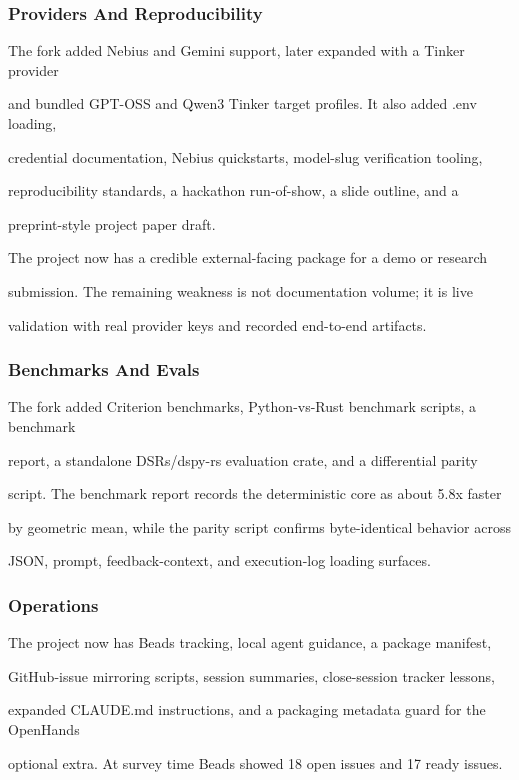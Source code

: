 \documentclass[twocolumn,10pt,letterpaper]{article}
\begin{document}
\subsubsection{Providers And Reproducibility}

The fork added Nebius and Gemini support, later expanded with a Tinker provider

and bundled GPT-OSS and Qwen3 Tinker target profiles. It also added .env loading,

credential documentation, Nebius quickstarts, model-slug verification tooling,

reproducibility standards, a hackathon run-of-show, a slide outline, and a

preprint-style project paper draft.


The project now has a credible external-facing package for a demo or research

submission. The remaining weakness is not documentation volume; it is live

validation with real provider keys and recorded end-to-end artifacts.


\subsubsection{Benchmarks And Evals}

The fork added Criterion benchmarks, Python-vs-Rust benchmark scripts, a benchmark

report, a standalone DSRs/dspy-rs evaluation crate, and a differential parity

script. The benchmark report records the deterministic core as about 5.8x faster

by geometric mean, while the parity script confirms byte-identical behavior across

JSON, prompt, feedback-context, and execution-log loading surfaces.


\subsubsection{Operations}

The project now has Beads tracking, local agent guidance, a package manifest,

GitHub-issue mirroring scripts, session summaries, close-session tracker lessons,

expanded CLAUDE.md instructions, and a packaging metadata guard for the OpenHands

optional extra. At survey time Beads showed 18 open issues and 17 ready issues.
\end{document}
